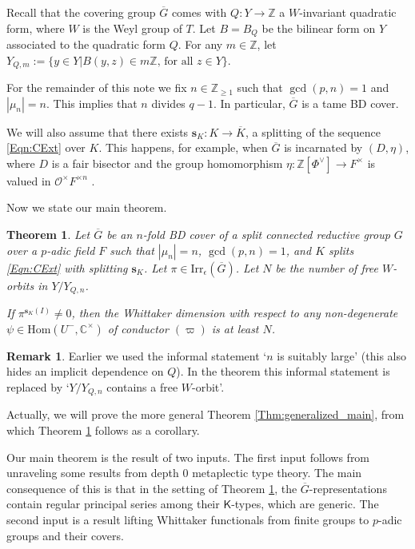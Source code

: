 \documentclass[11pt]{amsart}
\theoremstyle{plain}
\newtheorem{Thm}[equation]{Theorem}
\theoremstyle{definition}
\newtheorem*{Rmk}{Remark}
\numberwithin{equation}{section}
\newcommand{\C}{\mathbb{C}}
\newcommand{\Z}{\mathbb{Z}}
\newcommand{\Gt}{\overline{G}}
\newcommand{\Kt}{\overline{K}}
\newcommand{\Yt}{Y_{Q,n}}
\newcommand{\s}{\mathbf{s}}
\newcommand{\Ocal}{\mathcal{O}}
\newcommand{\Kf}{\mathsf{K}}
\begin{document}
Recall that the covering group $\Gt$ comes with $Q:Y\rightarrow \Z$ a $W$-invariant quadratic form, where $W$ is the Weyl group of $T$. Let $B=B_{Q}$ be the bilinear form on $Y$ associated to the quadratic form $Q$. For any $m\in\Z$, let $Y_{Q,m}:=\{y\in Y|B(y,z)\in m\Z\text{, for all }z\in Y\}$.

For the remainder of this note we fix $n\in\Z_{\geq 1}$ such that $\gcd(p,n)=1$ and $|\mu_{n}|=n$. This implies that $n$ divides $q-1$. In particular, $\Gt$ is a tame BD cover.

We will also assume that there exists $\s_{K}:K\rightarrow \Kt$, a splitting of the sequence \eqref{Eqn:CExt} over $K$. This happens, for example, when $\Gt$ is incarnated by $(D,\eta)$, where $D$ is a fair bisector and the group homomorphism $\eta:\Z[\Phi^{\vee}]\rightarrow F^{\times}$ is valued in $\Ocal^{\times}F^{\times n}$ \cite[Theorem 4.2 and subsequent remarks]{GG18}.

Now we state our main theorem.

\begin{Thm}\label{Thm:Main_Thm}
    Let $\Gt$ be an $n$-fold BD cover of a split connected reductive group $G$ over a $p$-adic field $F$ such that $|\mu_{n}|=n$, $\gcd(p,n)=1$, and $K$ splits \eqref{Eqn:CExt} with splitting $\s_{K}$. Let $\pi\in \mathrm{Irr}_{\epsilon}(\Gt)$. Let $N$ be the number of free $W$-orbits in $Y/\Yt$. 

    If $\pi^{\s_{K}(I)}\neq 0$, then the Whittaker dimension with respect to any non-degenerate $\psi\in \mathrm{Hom}(U^{-},\C^{\times})$ of conductor $(\varpi)$ is at least $N$. 
\end{Thm}


\begin{Rmk}
    Earlier we used the informal statement `$n$ is suitably large' (this also hides an implicit dependence on $Q$). In the theorem this informal statement is replaced by `$Y/\Yt$ contains a free $W$-orbit'. 
\end{Rmk}

Actually, we will prove the more general Theorem \ref{Thm:generalized_main}, from which Theorem \ref{Thm:Main_Thm} follows as a corollary.

Our main theorem is the result of two inputs. The first input follows from unraveling some results from depth $0$ metaplectic type theory. The main consequence of this is that in the setting of Theorem \ref{Thm:Main_Thm}, the $\Gt$-representations contain regular principal series among their $\Kf$-types, which are generic. The second input is a result lifting Whittaker functionals from finite groups to $p$-adic groups and their covers.
\end{document}
